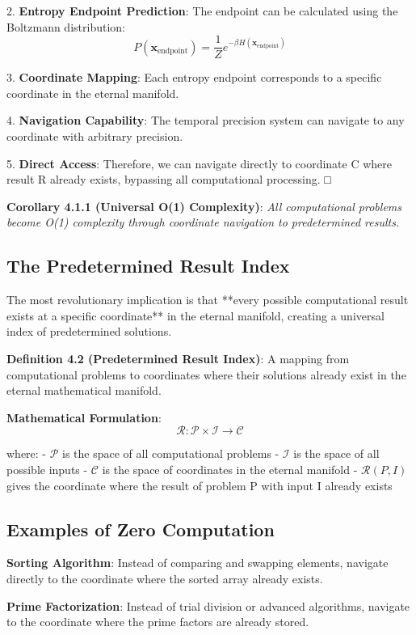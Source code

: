 \documentclass[12pt,a4paper]{article}
\theoremstyle{definition}
\begin{document}
{2. \textbf{Entropy Endpoint Prediction}: The endpoint can be calculated using the Boltzmann distribution:
   $$P(\mathbf{x}_{\text{endpoint}}) = \frac{1}{Z}e^{-\beta H(\mathbf{x}_{\text{endpoint}})}$$

3. \textbf{Coordinate Mapping}: Each entropy endpoint corresponds to a specific coordinate in the eternal manifold.

4. \textbf{Navigation Capability}: The temporal precision system can navigate to any coordinate with arbitrary precision.

5. \textbf{Direct Access}: Therefore, we can navigate directly to coordinate C where result R already exists, bypassing all computational processing. □

\textbf{Corollary 4.1.1 (Universal O(1) Complexity)}: \textit{All computational problems become O(1) complexity through coordinate navigation to predetermined results.}

\subsection{The Predetermined Result Index}

The most revolutionary implication is that **every possible computational result exists at a specific coordinate** in the eternal manifold, creating a universal index of predetermined solutions.

\textbf{Definition 4.2 (Predetermined Result Index)}: A mapping from computational problems to coordinates where their solutions already exist in the eternal mathematical manifold.

\textbf{Mathematical Formulation}:
$$\mathcal{R}: \mathcal{P} \times \mathcal{I} \rightarrow \mathcal{C}$$

where:
- $\mathcal{P}$ is the space of all computational problems
- $\mathcal{I}$ is the space of all possible inputs
- $\mathcal{C}$ is the space of coordinates in the eternal manifold
- $\mathcal{R}(P, I)$ gives the coordinate where the result of problem P with input I already exists

\subsection{Examples of Zero Computation}

\textbf{Sorting Algorithm}: Instead of comparing and swapping elements, navigate directly to the coordinate where the sorted array already exists.

\textbf{Prime Factorization}: Instead of trial division or advanced algorithms, navigate to the coordinate where the prime factors are already stored.

}
\end{document}
